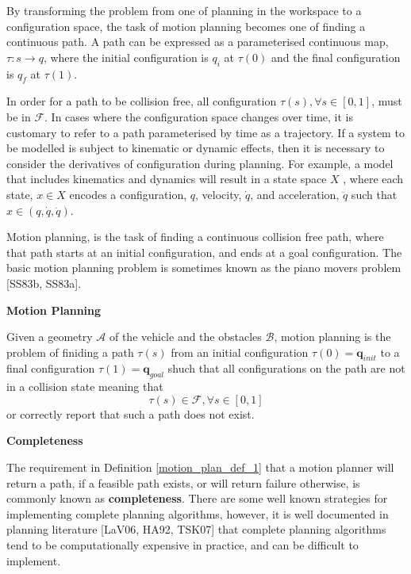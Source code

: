 By transforming the problem from one of planning in the workspace to a configuration
space, the task of motion planning becomes one of finding a continuous path. A path can be
expressed as a parameterised continuous map, $\tau: s \rightarrow q$, where the initial configuration is
$q_i$ at $\tau(0)$ and the final configuration is $q_f$ at $\tau(1)$. 

In order for a path to be collision free, all configuration $\tau(s), \forall s \in [0, 1]$, must be in $\mathcal{F}$. 
In cases where the configuration space changes over time, it is customary to refer to a path parameterised by time as a trajectory.
If a system to be modelled is subject to kinematic or dynamic effects, then it is necessary to
consider the derivatives of configuration during planning. For example, a model that includes
kinematics and dynamics will result in a state space $X$ , where each state, $x \in X$ encodes a
configuration, $q$, velocity, $\dot{q}$, and acceleration, $\ddot{q}$ such that $x \in (q, \dot{q}, \ddot{q})$.

Motion planning, is the task of finding a continuous collision free path, where that path starts at
an initial configuration, and ends at a goal configuration. The basic motion planning problem
is sometimes known as the piano movers problem [SS83b, SS83a].


\begin{framed}
\theoremstyle{definition}
\begin{definition}{\textbf{Motion Planning}}
\label{motion_plan_def_1}
 
Given a geometry $\mathcal{A}$ of the vehicle and the obstacles $\mathcal{B}$, motion planning is the problem
of finiding a path $\tau(s)$ from an initial configuration $\tau(0) = \mathbf{q}_{init}$ to a final 
configuration $\tau(1) = \mathbf{q}_{goal}$ shuch that all configurations on the path are not in a collision
state meaning that 
\begin{equation}
\tau(s) \in \mathcal{F}, \forall s \in [0,1] \nonumber
\end{equation} 
or correctly report that such a path does not exist.
\end{definition}
\end{framed}



\begin{framed}
\theoremstyle{remark}
\begin{remark}{\textbf{Completeness}}
 
The requirement in Definition \ref{motion_plan_def_1} that a motion planner will return a path, if a feasible path
exists, or will return failure otherwise, is commonly known as \textbf{completeness}. There are some
well known strategies for implementing complete planning algorithms, however, it is well
documented in planning literature [LaV06, HA92, TSK07] that complete planning algorithms
tend to be computationally expensive in practice, and can be difficult to implement.
\end{remark}
\end{framed}

